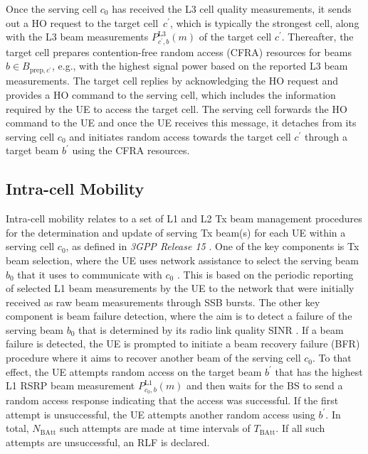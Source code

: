 \documentclass[10pt, conference]{IEEEtran}
\begin{document}
Once the serving cell $c_0$ has received the L3 cell quality measurements, it sends out a HO request to the target cell~$c^{\prime}$, which is typically the strongest cell, along with the L3 beam measurements $P_{c^{\prime},b}^\textrm{L3}(m)$ of the target cell $c^{\prime}$. Thereafter, the target cell prepares contention-free random access (CFRA) resources for beams $b \in B_{\mathrm{prep},c^{\prime}}$, e.g., with the highest signal power based on the reported L3 beam measurements. The target cell replies by acknowledging the HO request and provides a HO command to the serving cell, which includes the information required by the UE to access the target cell. The serving cell forwards the HO command to the UE and once the UE receives this message, it detaches from its serving cell $c_0$ and initiates random access towards the target cell $c^{\prime}$ through a target beam $b^{\prime}$ using the CFRA resources.

%
\subsection{Intra-cell Mobility} \label{Subsection2.2}
Intra-cell mobility relates to a set of L1 and L2 Tx beam management procedures for the determination and update of serving Tx beam(s) for each UE within a serving cell $c_0$, as defined in \textit{3GPP Release 15} \cite{b5}. One of the key components is Tx beam selection, where the UE uses network assistance to select the serving beam $b_0$ that it uses to communicate with $c_0$ \cite[Section II-A]{b4}. This is based on the periodic reporting of selected L1 beam measurements by the UE to the network that were initially received as raw beam measurements through SSB bursts. The other key component is beam failure detection, where the aim is to detect a failure of the serving beam $b_0$ that is determined by its radio link quality SINR \cite{b10}. If a beam failure is detected, the UE is prompted to initiate a beam recovery failure (BFR) procedure where it aims to recover another beam of the serving cell $c_0$. To that effect, the UE attempts random access on the target beam $b^{\prime}$ that has the highest L1 RSRP beam measurement $P_{c_0,b}^\textrm{L1}(m)$ and then waits for the BS to send a random access response indicating that the access was successful. If the first attempt is unsuccessful, the UE attempts another random access using $b^{\prime}$. In total, $N_\mathrm{BAtt}$ such attempts are made at time intervals of $T_\mathrm{BAtt}$. If all such attempts are unsuccessful, an RLF is declared.
\end{document}
